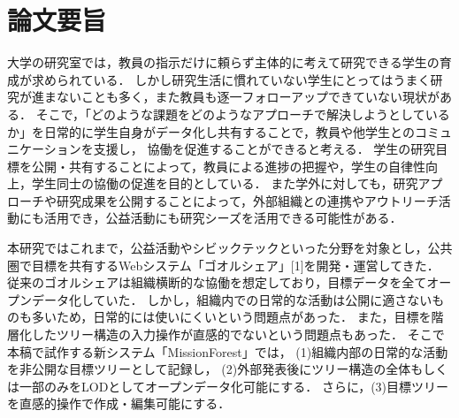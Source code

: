 \chapter*{論文要旨}
\label{chap0}
大学の研究室では，教員の指示だけに頼らず主体的に考えて研究できる学生の育成が求められている．
しかし研究生活に慣れていない学生にとってはうまく研究が進まないことも多く，また教員も逐一フォローアップできていない現状がある．
そこで，「どのような課題をどのようなアプローチで解決しようとしているか」を日常的に学生自身がデータ化し共有することで，教員や他学生とのコミュニケーションを支援し，
協働を促進することができると考える．
学生の研究目標を公開・共有することによって，教員による進捗の把握や，学生の自律性向上，学生同士の協働の促進を目的としている．
また学外に対しても，研究アプローチや研究成果を公開することによって，外部組織との連携やアウトリーチ活動にも活用でき，公益活動にも研究シーズを活用できる可能性がある．

本研究ではこれまで，公益活動やシビックテックといった分野を対象とし，公共圏で目標を共有するWebシステム「ゴオルシェア」[1]を開発・運営してきた．
従来のゴオルシェアは組織横断的な協働を想定しており，目標データを全てオープンデータ化していた．
しかし，組織内での日常的な活動は公開に適さないものも多いため，日常的には使いにくいという問題点があった．
また，目標を階層化したツリー構造の入力操作が直感的でないという問題点もあった．
そこで本稿で試作する新システム「MissionForest」では，
(1)組織内部の日常的な活動を非公開な目標ツリーとして記録し，
(2)外部発表後にツリー構造の全体もしくは一部のみをLODとしてオープンデータ化可能にする．
さらに，(3)目標ツリーを直感的操作で作成・編集可能にする．

